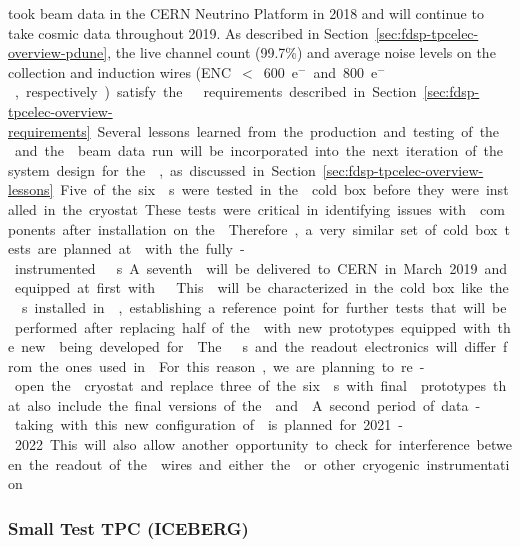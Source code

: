  took beam data in the CERN Neutrino Platform in 2018 and will continue
to take cosmic data throughout 2019. As described in Section~\ref{sec:fdsp-tpcelec-overview-pdune},
the live channel count (99.7\%) and average noise levels on the collection and induction wires 
(ENC~$<$~\SI{600}{e$^-$} and \SI{800}{e$^-$}, respectively) satisfy the  requirements described 
in Section~\ref{sec:fdsp-tpcelec-overview-requirements}. Several lessons learned from the production 
and testing of the  and the  beam data run will be incorporated into the 
next iteration of the system design for the , as discussed in 
Section~\ref{sec:fdsp-tpcelec-overview-lessons}.

Five of the six s were tested in the  cold box
before they were installed in the cryostat. These tests were critical
in identifying issues with  components after installation
on the . Therefore, a very similar set of cold box tests are planned at  
with the fully-instrumented  s. A seventh  will be delivered
to CERN in March 2019 and equipped at first with  . This
 will be characterized in the cold box like the s installed
in , establishing a reference point for further tests that will be
performed after replacing half of the  with new prototypes equipped with the
new  being developed for . 

The  s and the readout electronics will differ from the ones used 
in . For this reason, we are planning to re-open the  cryostat 
and replace three of the six s with final  prototypes that also include 
the final versions of the  and . A second period of data-taking 
with this new configuration of  is planned for 2021-2022. This will also 
allow another opportunity to check for interference between the readout of the  
wires and either the  or other cryogenic instrumentation.


\subsubsection{Small Test TPC (ICEBERG)}
\label{sec:fdsp-tpcelec-qa-facilities-testtpc}

